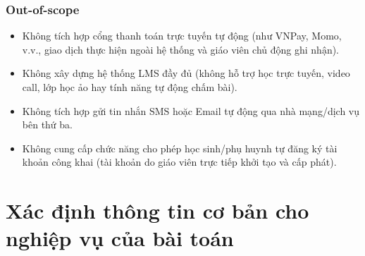 \subsubsection{Out-of-scope}
\begin{itemize}
    \item Không tích hợp cổng thanh toán trực tuyến tự động (như VNPay, Momo, v.v., giao dịch thực hiện ngoài hệ thống và giáo viên chủ động ghi nhận).
    \item Không xây dựng hệ thống LMS đầy đủ (không hỗ trợ học trực tuyến, video call, lớp học ảo hay tính năng tự động chấm bài).
    \item Không tích hợp gửi tin nhắn SMS hoặc Email tự động qua nhà mạng/dịch vụ bên thứ ba.
    \item Không cung cấp chức năng cho phép học sinh/phụ huynh tự đăng ký tài khoản công khai (tài khoản do giáo viên trực tiếp khởi tạo và cấp phát).
\end{itemize}



\section{Xác định thông tin cơ bản cho nghiệp vụ của bài toán}


